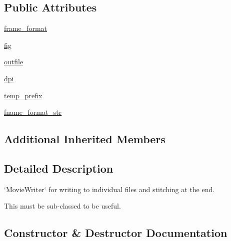 \subsection*{Public Attributes}
\begin{DoxyCompactItemize}
\item 
\hyperlink{classmatplotlib_1_1animation_1_1FileMovieWriter_a8691859622cf9772851a9681a64bf849}{frame\+\_\+format}
\item 
\hyperlink{classmatplotlib_1_1animation_1_1FileMovieWriter_ac61243658714a398ea13b2821a756647}{fig}
\item 
\hyperlink{classmatplotlib_1_1animation_1_1FileMovieWriter_ae3ef0c1fca69da36e21ce4e65be58439}{outfile}
\item 
\hyperlink{classmatplotlib_1_1animation_1_1FileMovieWriter_acb15d67886c11ad2174b258d7a340a45}{dpi}
\item 
\hyperlink{classmatplotlib_1_1animation_1_1FileMovieWriter_a2583b09268f7847409c176551e00684e}{temp\+\_\+prefix}
\item 
\hyperlink{classmatplotlib_1_1animation_1_1FileMovieWriter_a16b77176136373a550624ac68df32d92}{fname\+\_\+format\+\_\+str}
\end{DoxyCompactItemize}
\subsection*{Additional Inherited Members}


\subsection{Detailed Description}
\begin{DoxyVerb}`MovieWriter` for writing to individual files and stitching at the end.

This must be sub-classed to be useful.
\end{DoxyVerb}
 

\subsection{Constructor \& Destructor Documentation}
\mbox{\label{classmatplotlib_1_1animation_1_1FileMovieWriter_afded2f6d5d2cb09309ebdeb70f624b98}} 
